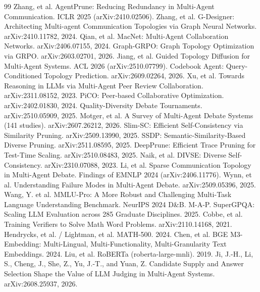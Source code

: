 \documentclass[11pt]{article}
\begin{document}
\begin{thebibliography}{99}
 Zhang, et al. AgentPrune: Reducing Redundancy in Multi-Agent Communication. ICLR 2025 (arXiv:2410.02506).
 Zhang, et al. G-Designer: Architecting Multi-agent Communication Topologies via Graph Neural Networks. arXiv:2410.11782, 2024.
 Qian, et al. MacNet: Multi-Agent Collaboration Networks. arXiv:2406.07155, 2024.
 Graph-GRPO: Graph Topology Optimization via GRPO. arXiv:2603.02701, 2026.
 Jiang, et al. Guided Topology Diffusion for Multi-Agent Systems. ACL 2026 (arXiv:2510.07799).
 Codebook Agent: Query-Conditioned Topology Prediction. arXiv:2609.02264, 2026.
 Xu, et al. Towards Reasoning in LLMs via Multi-Agent Peer Review Collaboration. arXiv:2311.08152, 2023.
 PiCO: Peer-based Collaborative Optimization. arXiv:2402.01830, 2024.
 Quality-Diversity Debate Tournaments. arXiv:2510.05909, 2025.
 Motger, et al. A Survey of Multi-Agent Debate Systems (141 studies). arXiv:2607.26212, 2026.
 Slim-SC: Efficient Self-Consistency via Similarity Pruning. arXiv:2509.13990, 2025.
 SSDP: Semantic-Similarity-Based Diverse Pruning. arXiv:2511.08595, 2025.
 DeepPrune: Efficient Trace Pruning for Test-Time Scaling. arXiv:2510.08483, 2025.
 Naik, et al. DIVSE: Diverse Self-Consistency. arXiv:2310.07088, 2023.
 Li, et al. Sparse Communication Topology in Multi-Agent Debate. Findings of EMNLP 2024 (arXiv:2406.11776).
 Wynn, et al. Understanding Failure Modes in Multi-Agent Debate. arXiv:2509.05396, 2025.
 Wang, Y. et al. MMLU-Pro: A More Robust and Challenging Multi-Task Language Understanding Benchmark. NeurIPS 2024 D\&B.
 M-A-P. SuperGPQA: Scaling LLM Evaluation across 285 Graduate Disciplines. 2025.
 Cobbe, et al. Training Verifiers to Solve Math Word Problems. arXiv:2110.14168, 2021.
 Hendrycks, et al. / Lightman, et al. MATH-500. 2024.
 Chen, et al. BGE M3-Embedding: Multi-Lingual, Multi-Functionality, Multi-Granularity Text Embeddings. 2024.
 Liu, et al. RoBERTa (roberta-large-mnli). 2019.
 Ji, J.-H., Li, S., Cheng, J., She, Z., Yu, J.-T., and Yuan, Z. Candidate Supply and Answer Selection Shape the Value of LLM Judging in Multi-Agent Systems. arXiv:2608.25937, 2026.

\end{thebibliography}
\end{document}
